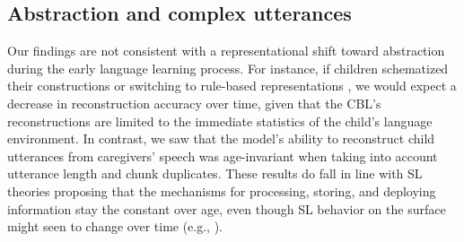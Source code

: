 \documentclass{article}
\begin{document}



\subsection{Abstraction and complex utterances}

Our findings are not consistent with a representational shift toward abstraction during the early language learning process. For instance, if children schematized their constructions or switching to rule-based representations \cite{bannard2009modeling, tomasello2003constructing, yang2016price}, we would expect a decrease in reconstruction accuracy over time, given that the CBL's reconstructions are limited to the immediate statistics of the child's language environment. In contrast, we saw that the model's ability to reconstruct child utterances from caregivers' speech was age-invariant when taking into account utterance length and chunk duplicates. These results do fall in line with SL theories proposing that the mechanisms for processing, storing, and deploying information stay the constant over age, even though SL behavior on the surface might seen to change over time (e.g., ).
\end{document}
